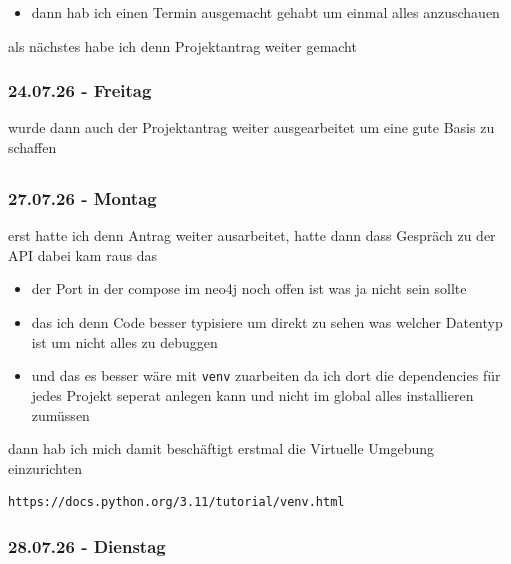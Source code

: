 \begin{itemize}
\item dann hab ich einen Termin ausgemacht gehabt um einmal alles anzuschauen
\end{itemize}

als nächstes habe ich denn Projektantrag weiter gemacht

\subsubsection{24.07.26 - Freitag}

wurde dann auch der Projektantrag weiter ausgearbeitet um eine gute Basis zu schaffen

\subsection{}
\subsubsection{27.07.26 - Montag}

erst hatte ich denn Antrag weiter ausarbeitet, hatte dann dass Gespräch zu der API dabei kam raus das

\begin{itemize}
\item der Port in der compose im neo4j noch offen ist was ja nicht sein sollte
\item das ich denn Code besser typisiere um direkt zu sehen was welcher Datentyp ist um nicht alles zu debuggen
\item und das es besser wäre mit \texttt{venv} zuarbeiten da ich dort die dependencies für jedes Projekt seperat anlegen kann und nicht im global alles installieren zumüssen
\end{itemize}

dann hab ich mich damit beschäftigt erstmal die Virtuelle Umgebung einzurichten

\begin{verbatim}
https://docs.python.org/3.11/tutorial/venv.html
\end{verbatim}

\subsubsection{28.07.26 - Dienstag}